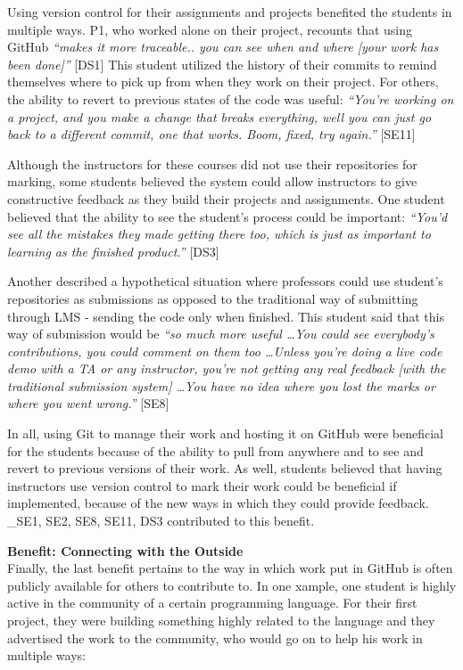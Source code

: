 Using version control for their assignments and projects benefited the students in multiple ways. P1, who worked alone on their project, recounts that using GitHub \textit{``makes it more traceable.. you can see when and where [your work has been done]''} [DS1] This student utilized the history of their commits to remind themselves where to pick up from when they work on their project. For others, the ability to revert to previous states of the code was useful: \textit{``You're working on a project, and you make a change that breaks everything, well you can just go back to a different commit, one that works. Boom, fixed, try again.''} [SE11]

Although the instructors for these courses did not use their repositories for marking, some students believed the system could allow instructors to give constructive feedback as they build their projects and assignments. One student believed that the ability to see the student's process could be important: \textit{``You'd see all the mistakes they made getting there too, which is just as important to learning as the finished product.''} [DS3]

Another described a hypothetical situation where professors could use student's repositories as submissions as opposed to the traditional way of submitting through LMS - sending the code only when finished. This student said that this way of submission would be \textit{``so much more useful \ldots You could see everybody's contributions, you could comment on them too \ldots Unless you're doing a live code demo with a TA or any instructor, you're not getting any real feedback [with the traditional submission system] \ldots You have no idea where you lost the marks or where you went wrong.''} [SE8]

In all, using Git to manage their work and hosting it on GitHub were beneficial for the students because of the ability to pull from anywhere and to see and revert to previous versions of their work. As well, students believed that having instructors use version control to mark their work could be beneficial if implemented, because of the new ways in which they could provide feedback. _{SE1, SE2, SE8, SE11, DS3} contributed to this benefit.

\textbf{Benefit: Connecting with the Outside} \\
Finally, the last benefit pertains to the way in which work put in GitHub is often publicly available for others to contribute to. In one xample, one student is highly active in the community of a certain programming language. For their first project, they were building something highly related to the language and they advertised the work to the community, who would go on to help his work in multiple ways:

